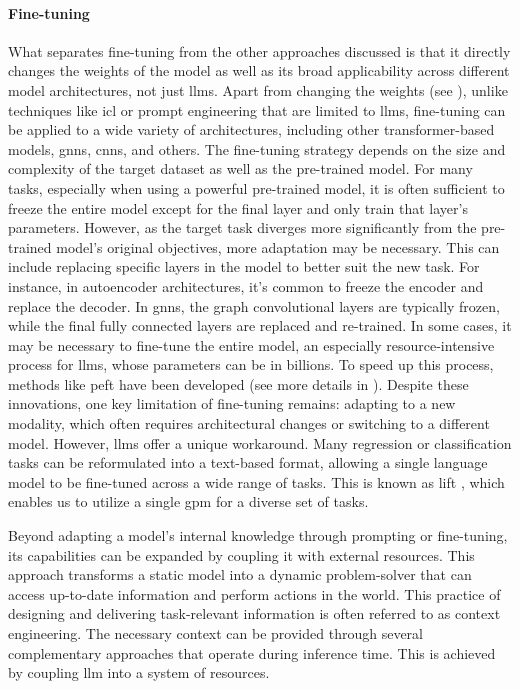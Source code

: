 \paragraph{Fine-tuning} \label{sec:fine-tuning} 
What separates fine-tuning from the other approaches discussed is that it directly changes the weights of the model as well as its broad applicability across different model architectures, not just \glspl{llm}. 
Apart from changing the weights (see ), unlike techniques like \gls{icl} or prompt engineering that are limited to \glspl{llm}, fine-tuning can be applied to a wide variety of architectures, including other transformer-based models, \glspl{gnn}, \glspl{cnn}, and others. 
The fine-tuning strategy depends on the size and complexity of the target dataset as well as the pre-trained model. For many tasks, especially when using a powerful pre-trained model, it is often sufficient to freeze the entire model except for the final layer and only train that layer's parameters. 
However, as the target task diverges more significantly from the pre-trained model’s original objectives, more adaptation may be necessary. This can include replacing specific layers in the model to better suit the new task. For instance, in autoencoder architectures, it's common to freeze the encoder and replace the decoder. In \glspl{gnn}, the graph convolutional layers are typically frozen, while the final fully connected layers are replaced and re-trained. In some cases, it may be necessary to fine-tune the entire model, an especially resource-intensive process for \glspl{llm}, whose parameters can be in billions. To speed up this process, methods like \gls{peft} have been developed (see more details in ). 
Despite these innovations, one key limitation of fine-tuning remains: adapting to a new modality, which often requires architectural changes or switching to a different model. However, \glspl{llm} offer a unique workaround. Many regression or classification tasks can be reformulated into a text-based format, allowing a single language model to be fine-tuned across a wide range of tasks. This is known as \gls{lift} \autocite{dinh2022lift}, which enables us to utilize a single \gls{gpm} for a diverse set of tasks.

Beyond adapting a model's internal knowledge through prompting or fine-tuning, its capabilities can be  expanded by coupling it with external resources. This approach transforms a static model into a dynamic problem-solver that can access up-to-date information and perform actions in the world. This practice of designing and delivering task-relevant information is often referred to as context engineering. The necessary context can be provided through several complementary approaches that operate during inference time. This is achieved by coupling \gls{llm} into a system of resources.

